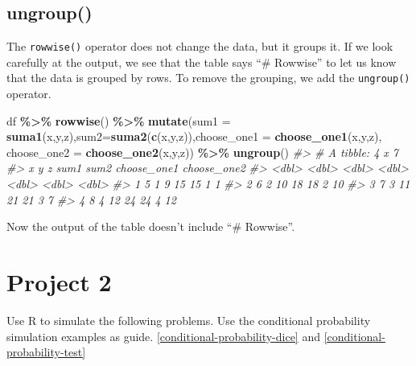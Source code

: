 \documentclass[
]{book}
\newenvironment{Shaded}{\begin{snugshade}}{\end{snugshade}}
\newcommand{\AttributeTok}[1]{\textcolor[rgb]{0.13,0.29,0.53}{#1}}
\newcommand{\CommentTok}[1]{\textcolor[rgb]{0.56,0.35,0.01}{\textit{#1}}}
\newcommand{\FunctionTok}[1]{\textcolor[rgb]{0.13,0.29,0.53}{\textbf{#1}}}
\newcommand{\NormalTok}[1]{#1}
\newcommand{\SpecialCharTok}[1]{\textcolor[rgb]{0.81,0.36,0.00}{\textbf{#1}}}
\theoremstyle{definition}
\theoremstyle{definition}
\theoremstyle{definition}
\theoremstyle{definition}
\theoremstyle{remark}
\begin{document}
\hypertarget{ungroup}{%
\section{ungroup()}\label{ungroup}}

The \texttt{rowwise()} operator does not change the data, but it groups it. If we look carefully at the output, we see that the table says ``\# Rowwise'' to let us know that the data is grouped by rows. To remove the grouping, we add the \texttt{ungroup()} operator.

\begin{Shaded}
\begin{Highlighting}[]
\NormalTok{df }\SpecialCharTok{\%\textgreater{}\%}
  \FunctionTok{rowwise}\NormalTok{() }\SpecialCharTok{\%\textgreater{}\%}
  \FunctionTok{mutate}\NormalTok{(}\AttributeTok{sum1 =} \FunctionTok{suma1}\NormalTok{(x,y,z),}\AttributeTok{sum2=}\FunctionTok{suma2}\NormalTok{(}\FunctionTok{c}\NormalTok{(x,y,z)),}\AttributeTok{choose\_one1 =} \FunctionTok{choose\_one1}\NormalTok{(x,y,z), }\AttributeTok{choose\_one2 =} \FunctionTok{choose\_one2}\NormalTok{(x,y,z)) }\SpecialCharTok{\%\textgreater{}\%}
  \FunctionTok{ungroup}\NormalTok{()}
\CommentTok{\#\textgreater{} \# A tibble: 4 x 7}
\CommentTok{\#\textgreater{}       x     y     z  sum1  sum2 choose\_one1 choose\_one2}
\CommentTok{\#\textgreater{}   \textless{}dbl\textgreater{} \textless{}dbl\textgreater{} \textless{}dbl\textgreater{} \textless{}dbl\textgreater{} \textless{}dbl\textgreater{}       \textless{}dbl\textgreater{}       \textless{}dbl\textgreater{}}
\CommentTok{\#\textgreater{} 1     5     1     9    15    15           1           1}
\CommentTok{\#\textgreater{} 2     6     2    10    18    18           2          10}
\CommentTok{\#\textgreater{} 3     7     3    11    21    21           3           7}
\CommentTok{\#\textgreater{} 4     8     4    12    24    24           4          12}
\end{Highlighting}
\end{Shaded}

Now the output of the table doesn't include ``\# Rowwise''.

\hypertarget{project-2}{%
\chapter{Project 2}\label{project-2}}

Use R to simulate the following problems. Use the conditional probability simulation examples as guide. \ref{conditional-probability-dice} and \ref{conditional-probability-test}
\end{document}
